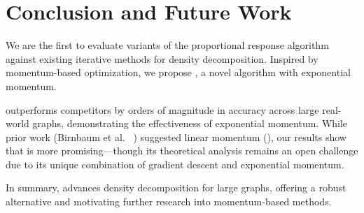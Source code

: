 \section{Conclusion and Future Work}
We are the first to evaluate variants of the proportional response algorithm against existing iterative methods for density decomposition. Inspired by momentum-based optimization, we propose \prexp, a novel algorithm with exponential momentum.

\prexp outperforms competitors by orders of magnitude in accuracy across large real-world graphs, demonstrating the effectiveness of exponential momentum. While prior work (Birnbaum et al. ~\cite{DBLP:conf/sigecom/BirnbaumDX11}) suggested linear momentum (\prlin), our results show that \prexp is more promising—though its theoretical analysis remains an open challenge due to its unique combination of gradient descent and exponential momentum.

In summary, \prexp advances density decomposition for large graphs, offering a robust alternative and motivating further research into momentum-based methods.

\ignore{
\begin{acks}

\end{acks}
}


